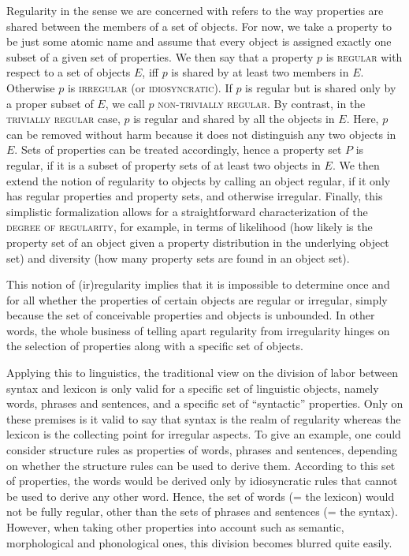 \documentclass[output=paper
,modfonts
,nonflat
,biblatexbackend=biber
]{langsci/langscibook}
\begin{document}
Regularity in the sense we are concerned with refers to the way properties are shared between the members of a set of objects. For now, we take a property to be just some atomic name and assume that every object is assigned exactly one subset of a given set of properties. We then say that a property $p$  is \textsc{regular} with respect to a set of objects $E$, iff $p$ is shared by at least two members in $E$. Otherwise $p$ is \textsc{irregular} (or \textsc{idiosyncratic}). If $p$ is regular but is shared only by a proper subset of $E$, we call $p$ \textsc{non-trivially regular}. By contrast, in the \textsc{trivially regular} case, $p$ is regular and shared by all the objects in $E$. Here, $p$ can be removed without harm because it does not distinguish any two objects in $E$. Sets of properties can be treated accordingly, hence a property set $P$ is regular, if it is a subset of property sets of at least two objects in $E$. We then extend the notion of regularity to objects by calling an object regular, if it only has regular properties and property sets, and otherwise irregular. Finally, this simplistic formalization allows for a straightforward characterization of the \textsc{degree of regularity}, for example, in terms of likelihood (how likely is the property set of an object given a property distribution in the underlying object set) and diversity (how many property sets are found in an object set).

This notion of (ir)regularity implies that it is impossible to determine once and for all whether the properties of certain objects are regular or irregular, simply because the set of conceivable properties and objects is unbounded. In other words, the whole business of telling apart regularity from irregularity hinges on the selection of properties along with a specific set of objects. 

Applying this to linguistics, the traditional view on the division of labor between syntax and lexicon is only valid for a specific set of linguistic objects, namely words, phrases and sentences, and a specific set of ``syntactic'' properties. Only on these premises is it valid to say that syntax is the realm of regularity whereas the lexicon is the collecting point for  irregular aspects. To give an example, one could consider  structure rules as properties of words, phrases and sentences, depending on whether the  structure rules can be used to derive them. According to this set of properties, the words would be derived only by idiosyncratic rules that cannot be used to derive any other word. Hence, the set of words (= the lexicon) would not be fully regular, other than the sets of phrases and sentences (= the syntax). However, when taking other properties into account such as semantic, morphological and phonological ones, this division becomes blurred quite easily.
\end{document}
